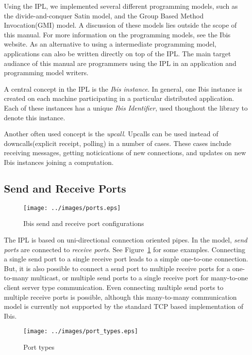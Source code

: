 \documentclass[10pt]{article}
\begin{document}
Using the IPL, we implemented several different programming models, such
as the divide-and-conquer Satin model, and the Group Based Method
Invocation(GMI) model. A discussion of these models lies outside the
scope of this manual. For more information on the programming models,
see the Ibis website. As an alternative to using a intermediate
programming model, applications can also be written directly on top of
the IPL. The main target audiance of this manual are programmers using
the IPL in an application and programming model writers.

A central concept in the IPL is the \emph{Ibis instance}. In general,
one Ibis instance is created on each machine participating in a
particular distributed application. Each of these instances has a unique
\emph{Ibis Identifier}, used thoughout the library to denote this
instance.

Another often used concept is the \emph{upcall}. Upcalls can be used
instead of downcalls(explicit receipt, polling) in a number of cases.
These cases include receiving messages, getting noticications of new
connections, and updates on new Ibis instances joining a computation.

\subsection{Send and Receive Ports}


\begin{figure} \centering
\texttt{[image: ../images/ports.eps]}
\caption{Ibis send and receive port configurations} \label{ports}
\end{figure}

The IPL is based on uni-directional connection oriented pipes. In the
model, \emph{send ports} are connected to \emph{receive ports}. See
Figure~\ref{ports} for some examples. Connecting a single send port to a
single receive port leads to a simple one-to-one connection. But, it is
also possible to connect a send port to multiple receive ports for a
one-to-many multicast, or multiple send ports to a single receive port
for many-to-one client server type communication. Even connecting
multiple send ports to multiple receive ports is possible, although this
many-to-many communication model is currently not supported by the
standard TCP based implementation of Ibis.

\begin{figure} \centering
\texttt{[image: ../images/port\_types.eps]}
\caption{Port types} \label{port_types}
\end{figure}
\end{document}
